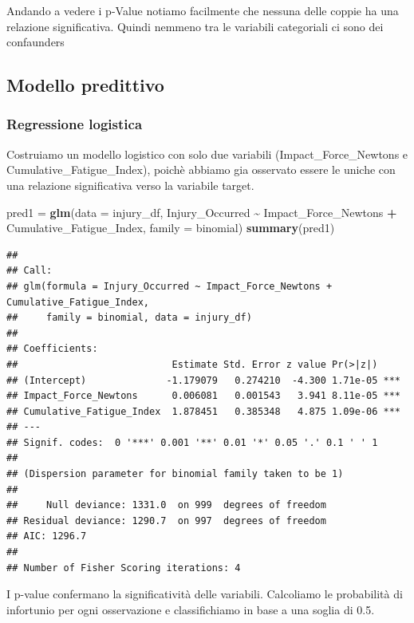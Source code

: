 \documentclass[
]{article}
\newenvironment{Shaded}{\begin{snugshade}}{\end{snugshade}}
\newcommand{\AttributeTok}[1]{\textcolor[rgb]{0.13,0.29,0.53}{#1}}
\newcommand{\FunctionTok}[1]{\textcolor[rgb]{0.13,0.29,0.53}{\textbf{#1}}}
\newcommand{\NormalTok}[1]{#1}
\newcommand{\OtherTok}[1]{\textcolor[rgb]{0.56,0.35,0.01}{#1}}
\newcommand{\SpecialCharTok}[1]{\textcolor[rgb]{0.81,0.36,0.00}{\textbf{#1}}}
\begin{document}
Andando a vedere i p-Value notiamo facilmente che nessuna delle coppie
ha una relazione significativa. Quindi nemmeno tra le variabili
categoriali ci sono dei confaunders

\subsection{Modello predittivo}\label{modello-predittivo}

\subsubsection{Regressione logistica}\label{regressione-logistica}

Costruiamo un modello logistico con solo due variabili
(Impact\_Force\_Newtons e Cumulative\_Fatigue\_Index), poichè abbiamo
gia osservato essere le uniche con una relazione significativa verso la
variabile target.

\begin{Shaded}
\begin{Highlighting}[]
\NormalTok{pred1 }\OtherTok{=} \FunctionTok{glm}\NormalTok{(}\AttributeTok{data =}\NormalTok{ injury\_df, Injury\_Occurred }\SpecialCharTok{\textasciitilde{}}\NormalTok{ Impact\_Force\_Newtons }\SpecialCharTok{+}\NormalTok{ Cumulative\_Fatigue\_Index, }\AttributeTok{family =}\NormalTok{ binomial)}
\FunctionTok{summary}\NormalTok{(pred1)}
\end{Highlighting}
\end{Shaded}

\begin{verbatim}
## 
## Call:
## glm(formula = Injury_Occurred ~ Impact_Force_Newtons + Cumulative_Fatigue_Index, 
##     family = binomial, data = injury_df)
## 
## Coefficients:
##                           Estimate Std. Error z value Pr(>|z|)    
## (Intercept)              -1.179079   0.274210  -4.300 1.71e-05 ***
## Impact_Force_Newtons      0.006081   0.001543   3.941 8.11e-05 ***
## Cumulative_Fatigue_Index  1.878451   0.385348   4.875 1.09e-06 ***
## ---
## Signif. codes:  0 '***' 0.001 '**' 0.01 '*' 0.05 '.' 0.1 ' ' 1
## 
## (Dispersion parameter for binomial family taken to be 1)
## 
##     Null deviance: 1331.0  on 999  degrees of freedom
## Residual deviance: 1290.7  on 997  degrees of freedom
## AIC: 1296.7
## 
## Number of Fisher Scoring iterations: 4
\end{verbatim}

I p-value confermano la significatività delle variabili. Calcoliamo le
probabilità di infortunio per ogni osservazione e classifichiamo in base
a una soglia di 0.5.
\end{document}

